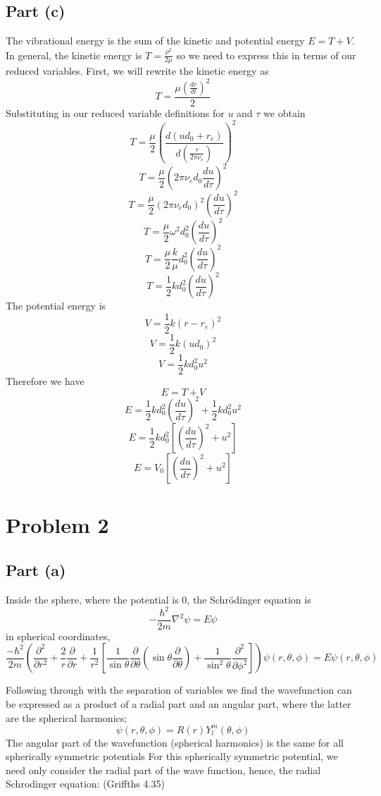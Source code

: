 \documentclass{article}
\begin{document}
\subsection{Part (c)}
The vibrational energy is the sum of the kinetic and potential energy $E = T + V$.
In general, the kinetic energy is $T = \frac{\rho^2}{2\mu}$ so we need to express this in terms of our reduced variables.
First, we will rewrite the kinetic energy as 
\[T = \frac{ \mu \left(\frac{dr}{dt} \right)^2 }{2} \]
Substituting in our reduced variable definitions for $u$ and $\tau$ we obtain
\[T = \frac{\mu}{2} \left( \frac{d(ud_0 + r_e)}{d(\frac{\tau}{2 \pi \nu_e})} \right)^2 \]
\[T = \frac{\mu}{2} \left( 2 \pi \nu_e d_0 \frac{du}{d\tau} \right)^2 \]
\[T = \frac{\mu}{2} (2 \pi \nu_e d_0)^2  \left(\frac{du}{d\tau}\right)^2 \]
\[T = \frac{\mu}{2} \omega^2 d_0^2  \left(\frac{du}{d\tau}\right)^2 \]
\[T = \frac{\mu}{2} \frac{k}{\mu} d_0^2  \left(\frac{du}{d\tau}\right)^2 \]
\[T = \frac{1}{2} k d_0^2  \left(\frac{du}{d\tau}\right)^2 \]
The potential energy is 
\[V = \frac{1}{2} k (r - r_e)^2  \]
\[V = \frac{1}{2} k (u d_0)^2  \]
\[V = \frac{1}{2} kd_0^2 u^2  \]
Therefore we have
\[ E = T + V\]
\[ E = \frac{1}{2} k d_0^2  \left(\frac{du}{d\tau}\right)^2 + \frac{1}{2} kd_0^2 u^2 \] 
\[ E = \frac{1}{2} k d_0^2 \left[ \left(\frac{du}{d\tau}\right)^2 + u^2 \right] \] 
\[ E = V_0 \left[ \left(\frac{du}{d\tau}\right)^2 + u^2 \right] \] 


\section{Problem 2}
\subsection{Part (a)}

Inside the sphere, where the potential is 0, the Schr{\"o}dinger equation is
\[-\frac{\hbar^2}{2m} \nabla^2 \psi = E \psi  \]
in spherical coordinates,
\[ \frac{-\hbar^2}{2m} \left( \frac{\partial^2}{\partial r^2} + \frac{2}{r} \frac{\partial}{\partial r} + \frac{1}{r^2} \left[\frac{1}{\sin \theta} \frac{\partial}{\partial \theta} (\sin \theta \frac{\partial}{\partial \theta}) + \frac{1}{\sin^2 \theta} \frac{\partial^2}{\partial \phi^2}  \right]  \right) \psi(r, \theta, \phi) = E \psi(r, \theta, \phi) \]

Following through with the separation of variables we find the wavefunction can be expressed as a product of a radial part and an angular part, where the latter are the spherical harmonics;
\[\psi(r, \theta, \phi) = R(r) Y_l^m(\theta, \phi)  \]
The angular part of the wavefunction (spherical harmonics) is the same for all spherically symmetric potentials 
For this spherically symmetric potential, we need only consider the radial part of the wave function, hence, the radial Schrodinger equation:
(Griffths 4.35)
\end{document}
